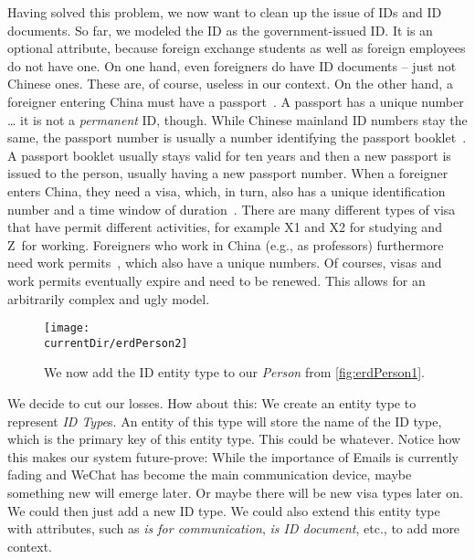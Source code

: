 Having solved this problem, we now want to clean up the issue of IDs and ID documents.
So far, we modeled the ID as the government-issued ID.
It is an optional attribute, because foreign exchange students as well as foreign employees do not have one.
On one hand, even foreigners do have ID documents -- just not Chinese ones.
These are, of course, useless in our context.
On the other hand, a foreigner entering China must have a passport~\cite{ICAO2021MRTDP3SCTAMEE}.
A passport has a unique number {\dots} it is not a \emph{permanent} ID, though.
While Chinese mainland ID numbers stay the same, the passport number is usually a number identifying the passport booklet~\cite{ICAO2004TAGOMRTDFMUOPINAPN}.
A passport booklet usually stays valid for ten years and then a new passport is issued to the person, usually having a new passport number.
When a foreigner enters China, they need a visa, which, in turn, also has a unique identification number and a time window of duration~\cite{CMOFA2019ITCV}.
There are many different types of visa that have permit different activities, for example X1 and X2 for studying and Z~for working.
Foreigners who work in China (e.g., as professors) furthermore need work permits~\cite{BD2006BDBKWOFFITOROC}, which also have a unique numbers.
Of courses, visas and work permits eventually expire and need to be renewed.
This allows for an arbitrarily complex and ugly model.

\begin{figure}%
\centering%
\texttt{[image: \\currentDir/erdPerson2]}%
\caption{We now add the ID entity type to our \emph{Person}  from \cref{fig:erdPerson1}.}%
\label{fig:erdPerson2}%
\end{figure}%

We decide to cut our losses.
How about this:
We create an entity type to represent \emph{ID Type}s.
An entity of this type will store the name of the ID type, which is the primary key of this entity type.
This could be           whatever.
Notice how this makes our system future-prove:
While the importance of Emails is currently fading and WeChat has become the main communication device, maybe something new will emerge later.
Or maybe there will be new visa types later on.
We could then just add a new ID type.
We could also extend this entity type with attributes, such as \emph{is for communication}, \emph{is ID document}, etc., to add more context.

